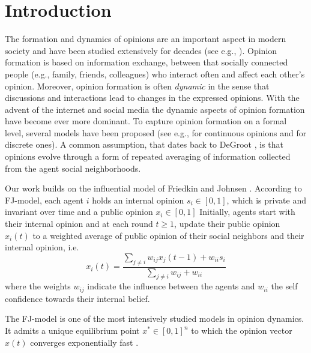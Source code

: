 \section{Introduction}
The formation and dynamics of opinions are an important aspect in modern
society and have been studied extensively for decades (see e.g., \cite{Jackson}).
Opinion formation is based on information exchange, between that socially
connected people (e.g., family, friends, colleagues) who interact often
and affect each other's opinion. Moreover, opinion
formation is often \emph{dynamic} in the sense that discussions and
interactions lead to changes in the expressed opinions. With the
advent of the internet and social media the dynamic aspects of
opinion formation have become ever more dominant. To capture opinion formation
on a formal level, several models have been proposed
(see e.g., \cite{DeGroot,FJ90,HK,BKO11,GS14,BGM13} for
continuous opinions and \cite{FGV12,YOASS13,BFM16} for discrete ones).
A common assumption, that dates back to DeGroot \cite{DeGroot}, is
that opinions evolve through a form of repeated averaging of
information collected from the agent social neighborhoods.

Our work builds on the influential model of Friedkin and
Johnsen \cite{FJ90}. According to FJ-model, each agent $i$ holds an
internal opinion $s_i\in [0,1]$, which is private and
invariant over time and a public opinion $x_i \in [0,1]$
Initially, agents start with their internal opinion and at
each round $t\geq1$, update their public opinion
$x_i(t)$ to a weighted average of public opinion of
their social neighbors and their internal opinion, i.e.
\[
  x_i(t) =
  \frac{\sum_{j\neq i}w_{ij}x_j(t-1) + w_{ii}s_i}
  {\sum_{j\neq i}w_{ij}+w_{ii}}
\]
where the weights $w_{ij}$ indicate the influence between
the agents and $w_{ii}$ the self confidence towards their
internal belief.

The FJ-model is one of the most intensively studied models
in opinion dynamics. It admits a
unique equilibrium point $x^* \in [0,1]^n$ to which
the opinion vector $x(t)$ converges exponentially fast
\cite{GS14}.

